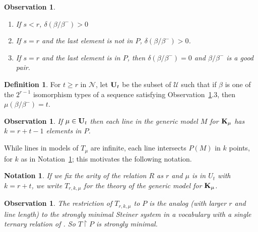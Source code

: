 \documentclass[11pt]{amsart}
\def\NN{\mathcal{N}}
\def\bK{{\bf K}}
\def\bU{{\bf U}}
\def\Uscr{\mathcal U}
\newtheorem{observation}[theorem]{Observation}
\newtheorem{notation}[theorem]{Notation}
\theoremstyle{definition}
\newtheorem{definition}[theorem]{Definition}
\theoremstyle{remark}
\numberwithin{equation}{section}
\begin{document}
\begin{observation}\label{shline}
\begin{enumerate}
\item If $s < r$, $\delta(\beta/\beta^-) > 0$
\item If $s=r$ and the last element is not in $P$, $\delta(\beta/\beta^-) >
    0$.
    \item    If $s=r$ and the last element is  in $P$, then
        $\delta(\beta/\beta^-) = 0$ and  $\beta/\beta^-$  is a good
pair.
\end{enumerate}
\end{observation}

\begin{definition}\label{kdep} For $t\geq r$ in $\NN$, let $\bU_t$ be the subset of $\Uscr$ such that if $\beta$ is
one of the $2^{r-1}$ isomorphism types of a sequence satisfying
Observation~\ref{shline}.3, then $\mu(\beta/\beta^-) = t$.
\end{definition}




\begin{observation}\label{linelength} If $\mu \in \bU_t$ then each line in the generic model
$M$ for $\bK_\mu$ has $k=r+t-1$ elements in $P$.
\end{observation}

 While lines in models of  $T_\mu$ are infinite,
 each line intersects $P(M)$ in $k$ points, for $k$ as in Notation~\ref{linelength}; this motivates the following notation.

\begin{notation} If we fix the arity of the relation $R$ as $r$ and $\mu$ is
in $U_t$ with $k = r+t$, we write $T_{r,k,\mu}$ for the theory of the generic
model for $\bK_\mu$.
\end{notation}

\begin{observation}\label{ansm} The restriction of $T_{r,k,\mu}$ to $P$ is the
analog (with larger $r$ and line length) to the strongly minimal Steiner
system in a vocabulary with a single ternary relation of \cite{BaldwinPao}.
So $T\upharpoonright P$ is strongly minimal.
\end{observation}

%
\end{document}
